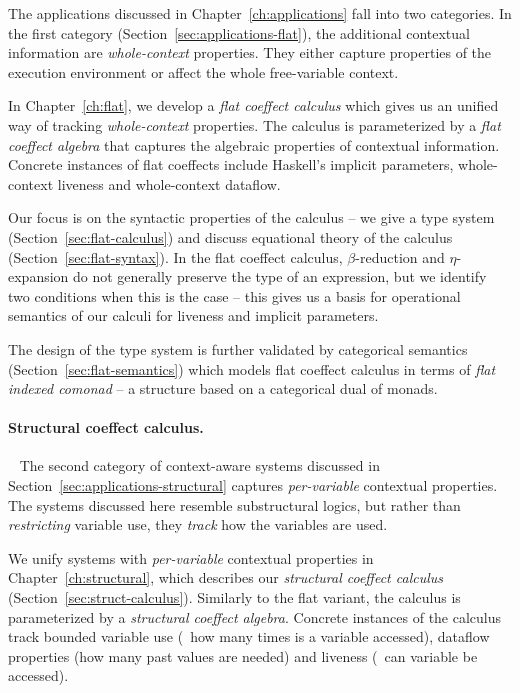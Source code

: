The applications discussed in Chapter~\ref{ch:applications} fall into two categories. In the first
category (Section~\ref{sec:applications-flat}), the additional contextual information are
\emph{whole-context} properties. They either capture properties of the execution environment or
affect the whole free-variable context.

In Chapter~\ref{ch:flat}, we develop a \emph{flat coeffect calculus} which gives us an unified way
of tracking \emph{whole-context} properties. The calculus is parameterized by a \emph{flat coeffect
algebra} that captures the algebraic properties of contextual information. Concrete
instances of flat coeffects include Haskell's implicit parameters, whole-context liveness and
whole-context dataflow.

Our focus is on the syntactic properties of the calculus -- we give a type system
(Section~\ref{sec:flat-calculus}) and discuss equational theory of the calculus (Section~\ref{sec:flat-syntax}).
In the flat coeffect calculus, $\beta$-reduction and $\eta$-expansion do not generally preserve
the type of an expression, but we identify two conditions when this is the case -- this gives us
a basis for operational semantics of our calculi for liveness and implicit parameters.

The design of the type system is further validated by categorical semantics
(Section~\ref{sec:flat-semantics}) which models flat coeffect calculus in terms of
\emph{flat indexed comonad} -- a structure based on a categorical dual of monads.


\paragraph{Structural coeffect calculus.}

~ The second category of context-aware systems discussed in Section~\ref{sec:applications-structural}
captures \emph{per-variable} contextual properties. The systems discussed here resemble substructural
logics, but rather than \emph{restricting} variable use, they \emph{track} how the variables are used.

We unify systems with \emph{per-variable} contextual properties in Chapter~\ref{ch:structural},
which describes our \emph{structural coeffect calculus} (Section~\ref{sec:struct-calculus}).
Similarly to the flat variant, the calculus is parameterized by a \emph{structural coeffect algebra}.
Concrete instances of the calculus track bounded variable use (\ie~how many times is a variable
accessed), dataflow properties (how many past values are needed) and liveness (\ie~can variable
be accessed).


